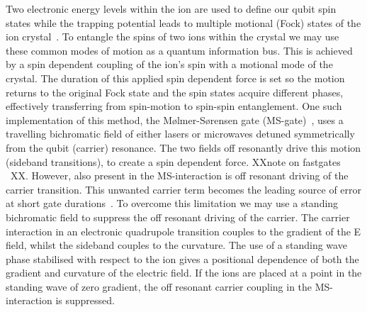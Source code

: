 \documentclass[12pt]{iopart}
\begin{document}
Two electronic energy levels within the ion are used to define our
qubit spin states while the trapping potential leads to multiple
motional (Fock) states of the ion crystal~\cite{wineland_experimental_1998}. To entangle the
spins of two ions within the crystal we may use these common modes
of motion as a quantum information bus. This is achieved by a spin
dependent coupling of the ion's spin with a motional mode of the
crystal.
The duration of this applied spin dependent force is set so the
motion returns to the original Fock state and the spin states
acquire different phases, effectively transferring from
spin-motion to spin-spin entanglement. One such implementation of
this method, the M\o lmer-S\o rensen gate (MS-gate)~\cite{sorensen_entanglement_2000}, uses a
travelling bichromatic field of either lasers or microwaves
detuned symmetrically from the qubit (carrier) resonance.
The two fields off resonantly drive this motion (sideband
transitions), to create a spin dependent force. XXnote on fastgates ~\cite{schafer_fast_2018, schafer_fast_2020}XX. However, also
present in the MS-interaction is off resonant driving of the
carrier transition. This unwanted carrier term becomes the
leading source of error at short gate durations~\cite{saner_breaking_2023}. To overcome
this limitation we may use a standing bichromatic field to
suppress the off resonant driving of the carrier. The carrier
interaction in an electronic quadrupole transition couples to the
gradient of the E field, whilst the sideband couples to the
curvature. The use of a standing wave phase stabilised with
respect to the ion gives a positional dependence of both the
gradient and curvature of the electric field. If the ions are
placed at a point in the standing wave of zero gradient, the off
resonant carrier coupling in the MS-interaction is suppressed.
\end{document}
